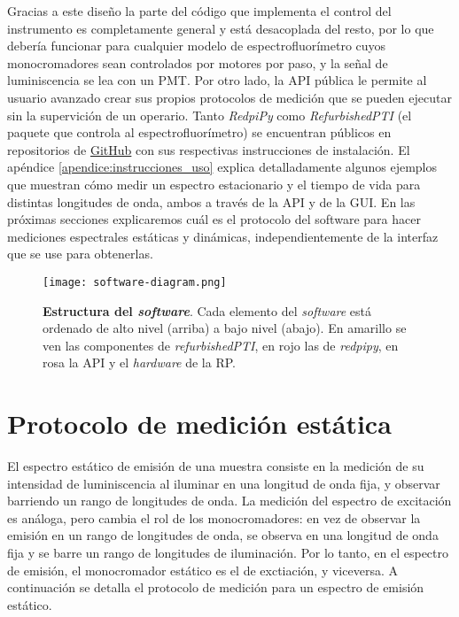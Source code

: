 Gracias a este diseño la parte del código que implementa el control del instrumento es completamente general y está desacoplada del resto, por lo que debería funcionar para cualquier modelo de espectrofluorímetro cuyos monocromadores sean controlados por motores por paso, y la señal de luminiscencia se lea con un PMT.
Por otro lado, la API pública le permite al usuario avanzado crear sus propios protocolos de medición que se pueden ejecutar sin la supervición de un operario.
Tanto \textit{RedpiPy} como \textit{RefurbishedPTI} (el paquete que controla al espectrofluorímetro) se encuentran públicos en repositorios de \href{https://github.com}{GitHub} con sus respectivas instrucciones de instalación. 
El apéndice \ref{apendice:instrucciones_uso} explica detalladamente algunos ejemplos que muestran cómo medir un espectro estacionario y el tiempo de vida para distintas longitudes de onda, ambos a través de la API y de la GUI.
En las próximas secciones explicaremos cuál es el protocolo del software para hacer mediciones espectrales estáticas y dinámicas, independientemente de la interfaz que se use para obtenerlas.



\begin{figure}[t]
     \centering
     \texttt{[image: software-diagram.png]}
     \caption{\textbf{Estructura del \textit{software}}. Cada elemento del \textit{software} está ordenado de alto nivel (arriba) a bajo nivel (abajo). En amarillo se ven las componentes de \textit{refurbishedPTI}, en rojo las de \textit{redpipy}, en rosa la API y el \textit{hardware} de la RP.}
     \label{fig:code}
\end{figure}

\section{Protocolo de medición estática}

El espectro estático de emisión de una muestra consiste en la medición de su intensidad de luminiscencia al iluminar en una longitud de onda fija, y observar barriendo un rango de longitudes de onda.
La medición del espectro de excitación es análoga, pero cambia el rol de los monocromadores: en vez de observar la emisión en un rango de longitudes de onda, se observa en una longitud de onda fija y se barre un rango de longitudes de iluminación.
Por lo tanto, en el espectro de emisión, el monocromador estático es el de exctiación, y viceversa.
A continuación se detalla el protocolo de medición para un espectro de emisión estático.

